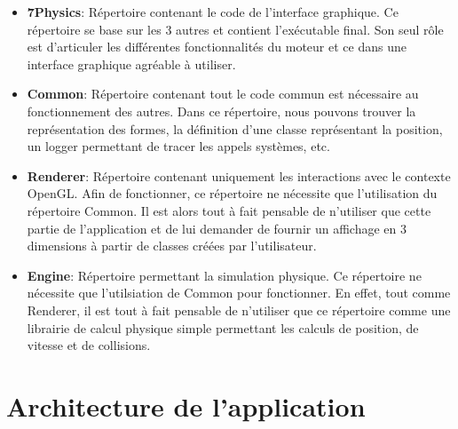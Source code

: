 \documentclass[11pt]{report}
\begin{document}
\begin{itemize}
  \item \textbf{7Physics}: Répertoire contenant le code de l'interface graphique. Ce répertoire se base sur les 3 autres
        et contient l'exécutable final. Son seul rôle est d'articuler les différentes fonctionnalités du moteur et ce
        dans une interface graphique agréable à utiliser.\newline
  \item\textbf{Common}: Répertoire contenant tout le code commun est nécessaire au fonctionnement des autres. Dans ce
        répertoire, nous pouvons trouver la représentation des formes, la définition d'une classe représentant la position,
        un logger permettant de tracer les appels systèmes, etc.\newline
  \item \textbf{Renderer}: Répertoire contenant uniquement les interactions avec le contexte OpenGL. Afin de fonctionner,
        ce répertoire ne nécessite que l'utilisation du répertoire Common. Il est alors tout à fait pensable de n'utiliser
        que cette partie de l'application et de lui demander de fournir un affichage en 3 dimensions à partir de classes
        créées par l'utilisateur.\newline
  \item \textbf{Engine}: Répertoire permettant la simulation physique. Ce répertoire ne nécessite que l'utilsiation
        de Common pour fonctionner. En effet, tout comme Renderer, il est tout à fait pensable de n'utiliser que ce répertoire
        comme une librairie de calcul physique simple permettant les calculs de position, de vitesse et de collisions.\newline
\end{itemize}



\chapter{Architecture de l'application}
\end{document}
